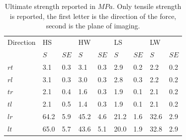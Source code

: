 \documentclass[10pt]{article}
\begin{document}
\begin{table}
\caption[Ultimate strength]{Ultimate strength reported in \(MPa\). Only tensile strength is reported, the first letter is the direction of the force, second is the plane of imaging.}
\label{table:ultimate strength}
\begin{tabular}{lllllllll}
\hline
Direction& HS && HW && LS && LW &\\
 & \(S\)&\(SE\)& \(S\)&\(SE\)& \(S\)&\(SE\)& \(S\)&\(SE\)\\
\hline
\(rt\) & 3.1 & 0.3& 3.1& 0.3& 2.9 & 0.2& 2.2 & 0.2 \\
\(rl\) & 3.1 & 0.3& 3.0& 0.3& 2.8 & 0.3& 2.2 & 0.2 \\
\(tr\) & 2.1 & 0.4& 1.6& 0.3& 1.9 & 0.1& 2.1 & 0.2 \\
\(tl\) & 2.1 & 0.5& 1.4& 0.3& 1.9 & 0.1& 2.1 & 0.2 \\
\(lr\) & 64.2 & 5.9& 45.2& 4.6& 21.2 & 1.6& 32.6 & 2.9 \\
\(lt\) & 65.0 & 5.7& 43.6& 5.1& 20.0 & 1.9& 32.8 & 2.9 \\
\hline
\end{tabular}
\end{table}
\end{document}
